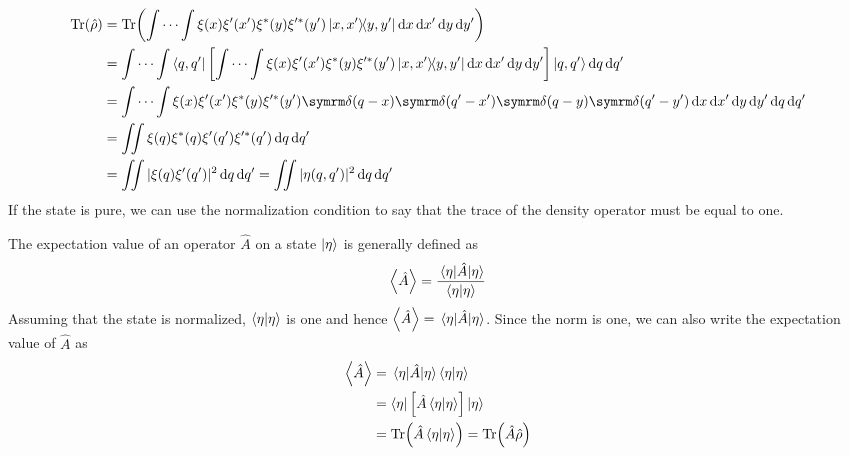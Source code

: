 \begin{align}
    \Tr(\dnst) &= \Tr(\idotsint\xi(x)\xi'(x')\xi\conj(y)\xi^{\prime\ast}(y')\ketbra{x, x'}{y, y'}\dd{x}\dd{x'}\dd{y}\dd{y'}) \\
    &= \idotsint\bra{q, q'}\left[\idotsint\xi(x)\xi'(x')\xi\conj(y)\xi^{\prime\ast}(y')\ketbra{x, x'}{y, y'}\dd{x}\dd{x'}\dd{y}\dd{y'}\right]\ket{q, q'}\dd{q}\dd{q'} \nonumber\\
    &= \idotsint\xi(x)\xi'(x')\xi\conj(y)\xi^{\prime\ast}(y')\ddel(q - x)\ddel(q' - x')\ddel(q - y)\ddel(q' - y')\dd{x}\dd{x'}\dd{y}\dd{y'}\dd{q}\dd{q'} \nonumber \\
    &= \iint\xi(q)\xi\conj(q)\xi'(q')\xi^{\prime\ast}(q')\dd{q}\dd{q'} \\
    &= \iint|\xi(q)\xi'(q')|^2\dd{q}\dd{q'} = \iint|\eta(q, q')|^2\dd{q}\dd{q'}
\end{align}
If the state is pure, we can use the normalization condition to say that the trace of the density operator must be equal to one.

The expectation value of an operator $\hat{A}$ on a state $\ket{\eta}$ is generally defined as
\begin{equation}
    \expval{\hat{A}} = \frac{\mel{\eta}{\hat{A}}{\eta}}{\braket{\eta}} 
\end{equation}
Assuming that the state is normalized, $\braket{\eta}$ is one and hence $\expval{\hat{A}} = \mel{\eta}{\hat{A}}{\eta}$. Since the norm is one, we can also write the expectation value of $\hat{A}$ as
\begin{align}
    \expval{\hat{A}} &= \mel{\eta}{\hat{A}}{\eta}\braket{\eta} \\
    &= \bra{\eta}\left[\hat{A}\braket{\eta}\right]\ket{\eta} \\
    &= \Tr(\hat{A}\braket{\eta}) = \Tr(\hat{A}\hat{\rho})
\end{align}


